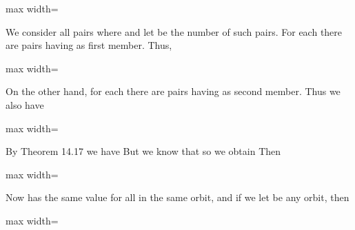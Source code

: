 \documentclass[11pt,oneside]{article}
\begin{document}
\begin{BookBody}
\begin{center}\begin{adjustbox}{max width=\linewidth}\end{adjustbox}\end{center}

 We consider all pairs  where  and let  be the number of such pairs. For each  there are  pairs having  as first member. Thus,

\begin{center}\begin{adjustbox}{max width=\linewidth}\end{adjustbox}\end{center}

\noindent On the other hand, for each  there are  pairs having  as second member. Thus we also have

\begin{center}\begin{adjustbox}{max width=\linewidth}\end{adjustbox}\end{center}

\noindent By Theorem 14.17 we have  But we know that  so we obtain  Then

\begin{center}\begin{adjustbox}{max width=\linewidth}\end{adjustbox}\end{center}

\noindent Now  has the same value for all  in the same orbit, and if we let  be any orbit, then

\begin{center}\begin{adjustbox}{max width=\linewidth}\end{adjustbox}\end{center}


\end{BookBody}
\end{document}
